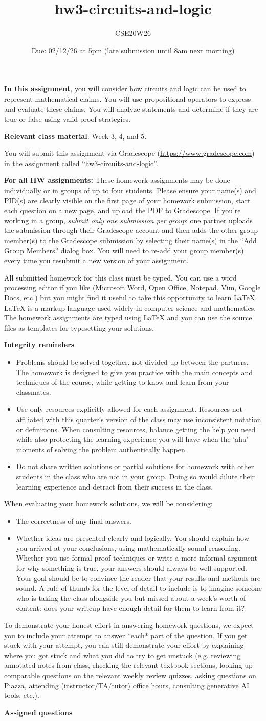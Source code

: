 \documentclass[12pt, oneside]{article}
\author{CSE20W26}
\title{hw3-circuits-and-logic}
\date{Due: 02/12/26 at 5pm (late submission until 8am next morning)}
\newcommand{\instructions}{{\bf For all HW assignments:} 
These homework assignments may be done individually or in groups of up to four students.
Please ensure your name(s) and PID(s)
are clearly visible on the first page of your homework
submission, start each question on a new page, and upload the PDF to Gradescope.
If you're working in a group, {\it submit only one submission per group}: one partner uploads the
submission through their Gradescope account and then adds the other group member(s) to the Gradescope submission
by selecting their name(s) in the ``Add Group Members'' dialog box. You will need to re-add your group member(s)
every time you resubmit a new version of your assignment.

All submitted homework for this class must be typed. 
You can use a word processing editor if you like (Microsoft Word, Open Office, Notepad, Vim, Google Docs, etc.) 
but you might find it useful to take this opportunity to learn LaTeX. 
LaTeX is a markup language used widely in computer science and mathematics. 
The homework assignments are typed using LaTeX and you can use the source files 
as templates for typesetting your solutions.

{\bf Integrity reminders}
\begin{itemize}
\item Problems should be solved together, not divided up between the partners. The homework is
designed to give you practice with the main concepts and techniques of the course, 
while getting to know and learn from your classmates.
\item Use only resources explicitly allowed for each assignment. Resources not affiliated with this quarter's version of the class may use inconsistent notation or definitions. When consulting resources, balance
getting the help you need while also protecting the learning experience you will have when the `aha' moments of solving the problem authentically happen.
\item Do not share written solutions or partial solutions for homework with 
other students in the class who are not in your group. Doing so would dilute their learning 
experience and detract from their success in the class.
\end{itemize}

When evaluating your homework solutions, we will be considering:
\begin{itemize}
\item The correctness of any final answers.
\item Whether ideas are presented clearly and logically. You should explain how you arrived at your conclusions, using
mathematically sound reasoning. Whether you use formal proof techniques or 
write a more informal argument
for why something is true, your answers should always be well-supported. 
Your goal should be to convince the
reader that your results and methods are sound. A rule of thumb for the level of detail to include is to imagine someone who is taking the class alongside you but missed about a week's worth of content: does your writeup have enough detail for them to learn from it?
\end{itemize}
To demonstrate your honest effort in answering homework questions, we 
expect you to include your attempt to answer *each* part of the question. 
If you get stuck with your attempt, you can still demonstrate 
your effort by explaining where you got stuck and what 
you did to try to get unstuck (e.g. reviewing annotated notes from class, checking the relevant textbook sections, looking up comparable questions on the relevant weekly review quizzes, asking questions on Piazza, 
attending (instructor/TA/tutor) office hours, consulting generative AI tools, etc.). 
}
\begin{document}
\maketitle
\thispagestyle{fancy}

{\bf In this assignment}, you will consider how circuits and logic can be used to represent
mathematical claims. You will use propositional operators
to express and evaluate these claims.  You will analyze statements and determine if they are true or false using valid proof strategies.

{\bf Relevant class material}: Week 3, 4, and 5.

You will submit this assignment via Gradescope
(\href{https://www.gradescope.com}{https://www.gradescope.com}) 
in the assignment called ``hw3-circuits-and-logic''.

\instructions

{\bf Assigned questions}
\end{document}
